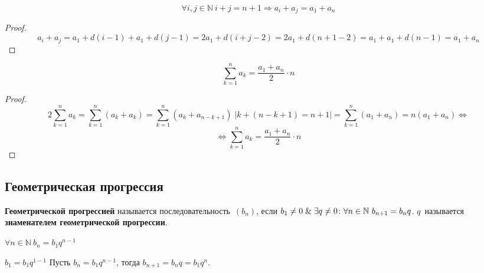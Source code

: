 \begin{lemma}
\begin{equation*}
\forall i, j \in \mathbb N \ i + j = n + 1 \Rightarrow a_i + a_j = a_1 + a_n
\end{equation*}
\end{lemma}
\begin{proof}
\begin{equation*}
a_i + a_j =
a_1 + d(i - 1) + a_1 + d(j - 1) =
2 a_1 + d(i + j - 2) =
2 a_1 + d(n + 1 - 2) =
a_1 + a_1 + d(n - 1) =
a_1 + a_n
\end{equation*}
\end{proof}

\begin{theorem}
\begin{equation*}
\sum_{k=1}^n a_k = \frac{a_1 + a_n}2 \cdot n
\end{equation*}
\end{theorem}
\begin{proof}
\begin{equation*}
2 \sum_{k=1}^n a_k =
\sum_{k=1}^n (a_k + a_k) =
\sum_{k=1}^n (a_k + a_{n-k+1}) \;
\left| k + (n - k + 1) = n + 1 \right| =
\sum_{k=1}^n (a_1 + a_n) =
n(a_1 + a_n) \Leftrightarrow
\end{equation*}
\begin{equation*}
\Leftrightarrow \sum_{k=1}^n a_k = \frac{a_1 + a_n}2 \cdot n
\end{equation*}
\end{proof}

\subsection{Геометрическая прогрессия}
 \textbf{Геометрической прогрессией} называется последовательность~$(b_n)$, если $b_1 \neq 0 \mathrel{\&} \exists q \neq 0 \colon \forall n \in \mathbb N \ b_{n+1} = b_n q$.
$q$~называется \textbf{знаменателем геометрической прогрессии}.

\begin{statement}
$\forall n \in \mathbb N \ b_n = b_1 q^{n-1}$
\end{statement}
\begin{proofmathind}
	\indbase $b_1 = b_1 q^{1-1}$
	\indstep Пусть $b_n = b_1 q^{n-1}$, тогда $b_{n+1} = b_n q = b_1 q^n$. \indend
\end{proofmathind}

